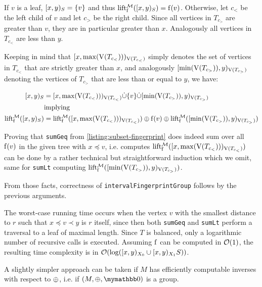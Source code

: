 If $v$ is a leaf, $[{x},{y})_{S} = \{v\}$ and thus $\operatorname{lift_{\operatorname{f}}^{\mathcal{M}}}([{x},{y})_{S}) = \operatorname{f}(v)$. Otherwise, let $c_{<}$ be the left child of $v$ and let $c_{>}$ be the right child. Since all vertices in $T_{c_{>}}$ are greater than $v$, they are in particular greater than $x$. Analogously all vertices in $T_{c_{<}}$ are less than $y$.

Keeping in mind that $[{x},{\max(\operatorname{V}(T_{c_{<}}))})_{\operatorname{V}(T_{c_{<}})}$ simply denotes the set of vertices in $T_{c_{<}}$ that are strictly greater than $x$, and analogously $[{\min(\operatorname{V}(T_{c_{>}}))},{y})_{\operatorname{V}(T_{c_{>}})}$ denoting the vertices of $T_{c_{>}}$ that are less than or equal to $y$, we have:

\begin{align*}
[{x},{y})_{S} &= {[{x},{\max(\operatorname{V}(T_{c_{<}}))})_{\operatorname{V}(T_{c_{<}})}} \dot{\cup} {{\{v\}} \dot{\cup} {[{\min(\operatorname{V}(T_{c_{>}}))},{y})_{\operatorname{V}(T_{c_{>}})}}}\\
&\mathrm{implying}\\
\operatorname{lift_{\operatorname{f}}^{\mathcal{M}}}([{x},{y})_{S}) &= {\operatorname{lift_{\operatorname{f}}^{\mathcal{M}}}([{x},{\max(\operatorname{V}(T_{c_{<}}))})_{\operatorname{V}(T_{c_{<}})})} \oplus {{\operatorname{f}(v)} \oplus{\operatorname{lift_{\operatorname{f}}^{\mathcal{M}}}([{\min(\operatorname{V}(T_{c_{>}}))},{y})_{\operatorname{V}(T_{c_{>}})})}}\\
\end{align*}

Proving that \texttt{sumGeq} from \cref{listing:subset-fingerprint} does indeed sum over all $\operatorname{f}(v)$ in the given tree with $x \preceq v$, i.e. computes $\operatorname{lift_{\operatorname{f}}^{\mathcal{M}}}([{x},{\max(\operatorname{V}(T_{c_{<}}))})_{\operatorname{V}(T_{c_{<}})})$ can be done by a rather technical but straightforward induction which we omit, same for \texttt{sumLt} computing $\operatorname{lift_{\operatorname{f}}^{\mathcal{M}}}([{\min(\operatorname{V}(T_{c_{>}}))},{y})_{\operatorname{V}(T_{c_{>}})})$.

From those facts, correctness of \texttt{intervalFingerprintGroup} follows by the previous arguments.

The worst-case running time occurs when the vertex $v$ with the smallest distance to $r$ such that $x \preceq v \prec y$ is $r$ itself, since then both \texttt{sumGeq} and \texttt{sumLt} perform a traversal to a leaf of maximal length. Since $T$ is balanced, only a logarithmic number of recursive calls is executed. Assuming $\operatorname{f}$ can be computed in $\mathcal{O}(1)$, the resulting time complexity is in $\mathcal{O}(\log([{x},{y})_{X_0} \cup [{x},{y})_{X_1}{S}))$.

A slightly simpler approach can be taken if $M$ has efficiently computable inverses with respect to $\oplus$, i.e. if $(M, \groupaddsym, \neutraladd)$ is a group.

